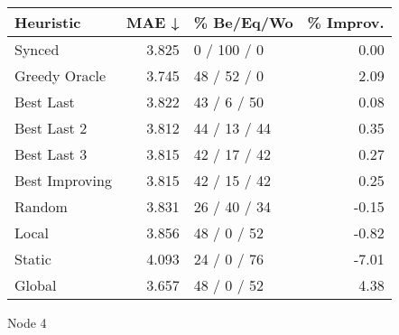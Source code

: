 \begin{tabular}{lrlr}
\toprule
\textbf{Heuristic} & \textbf{MAE ↓} & \textbf{\% Be/Eq/Wo} & \textbf{\% Improv.} \\
\midrule
            Synced &          3.825 &          0 / 100 / 0 &                0.00 \\
     Greedy Oracle &          3.745 &          48 / 52 / 0 &                2.09 \\
         Best Last &          3.822 &          43 / 6 / 50 &                0.08 \\
       Best Last 2 &          3.812 &         44 / 13 / 44 &                0.35 \\
       Best Last 3 &          3.815 &         42 / 17 / 42 &                0.27 \\
    Best Improving &          3.815 &         42 / 15 / 42 &                0.25 \\
            Random &          3.831 &         26 / 40 / 34 &               -0.15 \\
             Local &          3.856 &          48 / 0 / 52 &               -0.82 \\
            Static &          4.093 &          24 / 0 / 76 &               -7.01 \\
            Global &          3.657 &          48 / 0 / 52 &                4.38 \\
\bottomrule
\end{tabular}
\caption{Node 4}
\label{tab:ds_non_lr05_le1_bs2_4}
